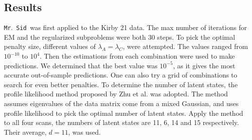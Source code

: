 \documentclass[times,twocolumn,final,authoryear]{elsarticle}
\newcommand{\mrsid}{{\sc \texttt{Mr}.~\texttt{Sid}}}
\begin{document}
\subsection{Results}
\mrsid~was first applied to the Kirby 21 data.
The max number of iterations for EM and the regularized subproblems were both 30 steps. To pick the optimal penalty size, different values of  $\lambda_A = \lambda_C$, were attempted. The values ranged from $10^{-10}$ to $10^{4}$. Then the estimations from each combination were used to make predictions. We determined that the best value was $10^{-5}$, as it gives the most accurate out-of-sample predictions. One can also try a grid of combinations to search for even better penalties. To determine the number of latent states, the profile likelihood method proposed by Zhu et al. \citep{zhu2006automatic} was adopted. The method assumes eigenvalues of the data matrix come from a mixed Gaussian, and uses profile likelihood to pick the optimal number of latent states. Apply the method to all four scans, the numbers of latent states are 11, 6, 14 and 15 respectively. Their average, $d=11$, was used.
\end{document}
